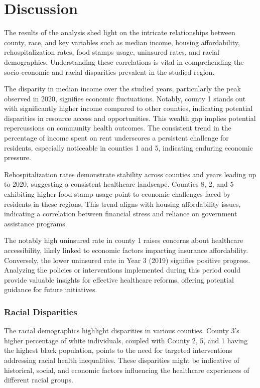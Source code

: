 \documentclass[12pt]{article}
\begin{document}
\section{Discussion}\label{sec:disc}

The results of the analysis shed light on the intricate relationships between county, race, and key 
variables such as median income, housing affordability, rehospitalization rates, food stamps usage, 
uninsured rates, and racial demographics. Understanding these correlations is vital in comprehending 
the socio-economic and racial disparities prevalent in the studied region.

The disparity in median income over the studied years, particularly the peak observed in 2020, 
signifies economic fluctuations. Notably, county 1 stands out with significantly higher income 
compared to other counties, indicating potential disparities in resource access and opportunities. 
This wealth gap implies potential repercussions on community health outcomes. The consistent trend in 
the percentage of income spent on rent underscores a persistent challenge for residents, especially 
noticeable in counties 1 and 5, indicating enduring economic pressure.

Rehospitalization rates demonstrate stability across counties and years leading up to 2020, suggesting 
a consistent healthcare landscape. Counties 8, 2, and 5 exhibiting higher food stamp usage point to economic 
challenges faced by residents in these regions. This trend aligns with housing affordability issues, 
indicating a correlation between financial stress and reliance on government assistance programs.

The notably high uninsured rate in county 1 raises concerns about healthcare accessibility, likely 
linked to economic factors impacting insurance affordability. Conversely, the lower uninsured rate in 
Year 3 (2019) signifies positive progress. Analyzing the policies or interventions implemented during 
this period could provide valuable insights for effective healthcare reforms, offering potential guidance 
for future initiatives.

\subsubsection{Racial Disparities}
The racial demographics highlight disparities in various counties. County 3's higher percentage of white 
individuals, coupled with County 2, 5, and 1 having the highest black population, points to the need for
targeted interventions addressing racial health inequalities. These disparities might be indicative of 
historical, social, and economic factors influencing the healthcare experiences of different racial groups.
\end{document}
